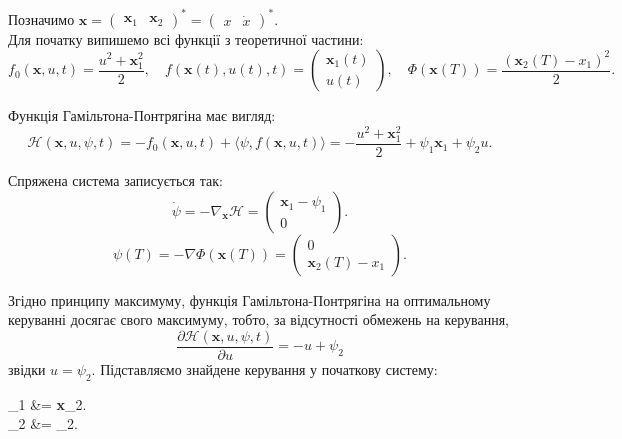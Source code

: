 \begin{solution}
	Позначимо $\textbf{x} = \begin{pmatrix} \textbf{x}_1 & \textbf{x}_2 \end{pmatrix}^* = \begin{pmatrix} x & \dot x \end{pmatrix}^*$. \\

	Для початку випишемо всі функції з теоретичної частини:
	\begin{equation}
		f_0(\textbf{x}, u, t) = \dfrac{u^2 + \textbf{x}_1^2}{2}, \quad f(\textbf{x}(t), u(t), t) = \begin{pmatrix} \textbf{x}_1(t) \\ u(t) \end{pmatrix}, \quad \Phi(\textbf{x}(T)) = \dfrac{(\textbf{x}_2(T) - x_1)^2}{2}.
	\end{equation}

	Функція Гамільтона-Понтрягіна має вигляд:
	\begin{equation}
		\mathcal{H}(\textbf{x}, u, \psi, t) = - f_0(\textbf{x}, u, t) + \langle \psi, f(\textbf{x}, u, t) \rangle = - \dfrac{u^2 + \textbf{x}_1^2}{2} + \psi_1 \textbf{x}_1 + \psi_2 u.
	\end{equation}

	Спряжена система записується так:
	\begin{equation}
		\dot \psi = - \nabla_\textbf{x} \mathcal{H} = \begin{pmatrix} \textbf{x}_1 - \psi_1 \\ 0 \end{pmatrix}.
	\end{equation}
	\begin{equation}
		\psi(T) = - \nabla \Phi(\textbf{x}(T)) = \begin{pmatrix} 0 \\ \textbf{x}_2(T) - x_1 \end{pmatrix}.
	\end{equation}

	Згідно принципу максимуму, функція Гамільтона-Понтрягіна на оптимальному керуванні досягає свого максимуму, тобто, за відсутності обмежень на керування,
	\begin{equation}
    	\dfrac{\partial \mathcal{H}(\textbf{x}, u, \psi, t)}{\partial u} = - u + \psi_2
	\end{equation}
	звідки $u = \psi_2$. Підставляємо знайдене керування у початкову систему:
	\begin{system}
	    _1 &= \textbf{x}_2. \\
	    _2 &= \psi_2.
	\end{system}
\end{solution}

